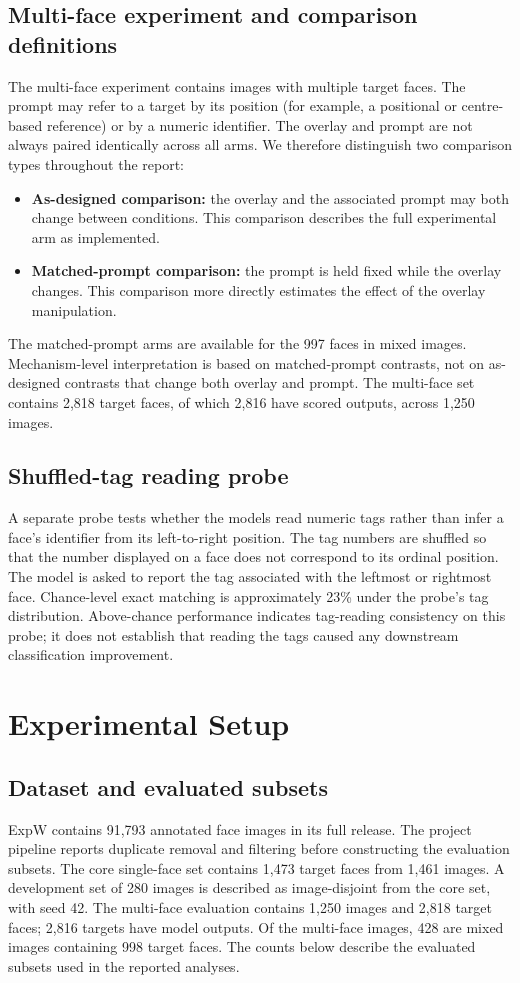 \documentclass[lettersize,journal]{IEEEtran}
\begin{document}
\subsection{Multi-face experiment and comparison definitions}
The multi-face experiment contains images with multiple target faces. The prompt may refer to a target by its position (for example, a positional or centre-based reference) or by a numeric identifier. The overlay and prompt are not always paired identically across all arms. We therefore distinguish two comparison types throughout the report:
\begin{itemize}
    \item \textbf{As-designed comparison:} the overlay and the associated prompt may both change between conditions. This comparison describes the full experimental arm as implemented.
    \item \textbf{Matched-prompt comparison:} the prompt is held fixed while the overlay changes. This comparison more directly estimates the effect of the overlay manipulation.
\end{itemize}
The matched-prompt arms are available for the 997 faces in mixed images. Mechanism-level interpretation is based on matched-prompt contrasts, not on as-designed contrasts that change both overlay and prompt. The multi-face set contains 2,818 target faces, of which 2,816 have scored outputs, across 1,250 images. 

\subsection{Shuffled-tag reading probe}
A separate probe tests whether the models read numeric tags rather than infer a face's identifier from its left-to-right position. The tag numbers are shuffled so that the number displayed on a face does not correspond to its ordinal position. The model is asked to report the tag associated with the leftmost or rightmost face. Chance-level exact matching is approximately 23\% under the probe's tag distribution. Above-chance performance indicates tag-reading consistency on this probe; it does not establish that reading the tags caused any downstream classification improvement.

\section{Experimental Setup}
\subsection{Dataset and evaluated subsets}
ExpW contains 91,793 annotated face images in its full release. The project pipeline reports duplicate removal and filtering before constructing the evaluation subsets. The core single-face set contains 1,473 target faces from 1,461 images. A development set of 280 images is described as image-disjoint from the core set, with seed 42. The multi-face evaluation contains 1,250 images and 2,818 target faces; 2,816 targets have model outputs. Of the multi-face images, 428 are mixed images containing 998 target faces. The counts below describe the evaluated subsets used in the reported analyses.
\end{document}
